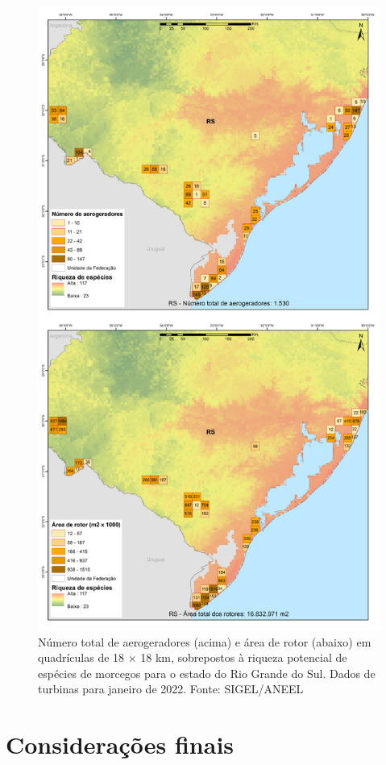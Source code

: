 \documentclass[
  oneside]{scrbook}
\begin{document}
\begin{figure}[H]

{\centering \includegraphics[width=0.7\linewidth]{imagens/cap09/Figura_9.17} 

}

\caption{Número total de aerogeradores (acima) e área de rotor (abaixo) em quadrículas de 18 × 18 km, sobrepostos à riqueza potencial de espécies de morcegos para o estado do Rio Grande do Sul. Dados de turbinas para janeiro de 2022. Fonte: SIGEL/ANEEL}\label{fig:82}
\end{figure}

\hypertarget{considerauxe7uxf5es-finais}{%
\section{Considerações finais}\label{considerauxe7uxf5es-finais}}
\end{document}
